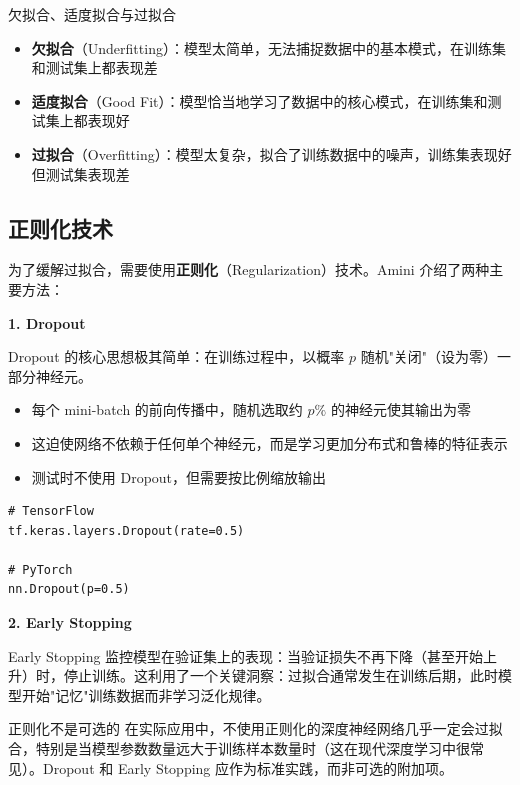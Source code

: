 \documentclass[a4paper]{article}
\begin{document}
\begin{importantbox}{欠拟合、适度拟合与过拟合}
\begin{itemize}
\item \textbf{欠拟合}（Underfitting）：模型太简单，无法捕捉数据中的基本模式，在训练集和测试集上都表现差
\item \textbf{适度拟合}（Good Fit）：模型恰当地学习了数据中的核心模式，在训练集和测试集上都表现好
\item \textbf{过拟合}（Overfitting）：模型太复杂，拟合了训练数据中的噪声，训练集表现好但测试集表现差
\end{itemize}
\end{importantbox}

\subsection{正则化技术}

为了缓解过拟合，需要使用\textbf{正则化}（Regularization）技术。Amini 介绍了两种主要方法：

\textbf{1. Dropout}

Dropout 的核心思想极其简单：在训练过程中，以概率 $p$ 随机"关闭"（设为零）一部分神经元。

\begin{itemize}
\item 每个 mini-batch 的前向传播中，随机选取约 $p\%$ 的神经元使其输出为零
\item 这迫使网络不依赖于任何单个神经元，而是学习更加分布式和鲁棒的特征表示
\item 测试时不使用 Dropout，但需要按比例缩放输出
\end{itemize}

\begin{lstlisting}[caption={Dropout 的代码实现}]
# TensorFlow
tf.keras.layers.Dropout(rate=0.5)

# PyTorch
nn.Dropout(p=0.5)
\end{lstlisting}

\textbf{2. Early Stopping}

Early Stopping 监控模型在验证集上的表现：当验证损失不再下降（甚至开始上升）时，停止训练。这利用了一个关键洞察：过拟合通常发生在训练后期，此时模型开始"记忆"训练数据而非学习泛化规律。

\begin{warningbox}{正则化不是可选的}
在实际应用中，不使用正则化的深度神经网络几乎一定会过拟合，特别是当模型参数数量远大于训练样本数量时（这在现代深度学习中很常见）。Dropout 和 Early Stopping 应作为标准实践，而非可选的附加项。
\end{warningbox}
\end{document}
